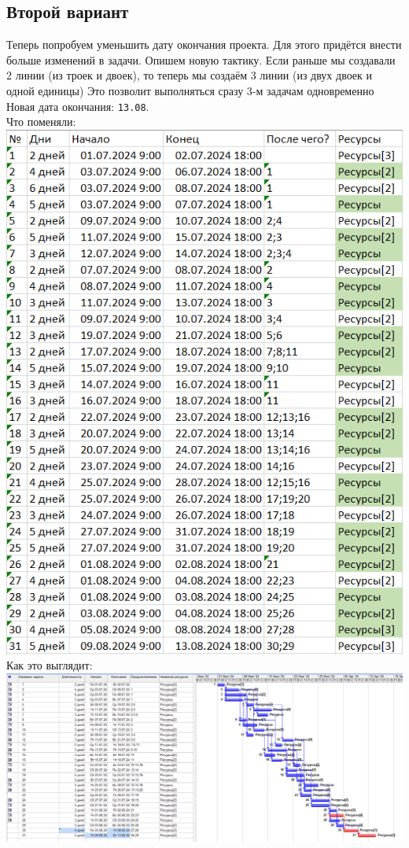 \documentclass[14pt]{article}
\begin{document}
	\subsection{Второй вариант}
		Теперь попробуем уменьшить дату окончания проекта.
		Для этого придётся внести больше изменений в задачи.
		Опишем новую тактику.
		Если раньше мы создавали 2 линии (из троек и двоек),
			то теперь мы создаём 3 линии (из двух двоек и одной единицы)
		Это позволит выполняться сразу 3-м задачам одновременно
		Новая дата окончания: \texttt{13.08}.\\
		{\LARGE Что поменяли:}\\
		\includegraphics[height=0.6\textheight]{../img/2b2_days_change.png}\\ 
		{\LARGE Как это выглядит:}\\
		\includegraphics[width=\textwidth]{../img/ot2b2_1.png}\\
\end{document}
